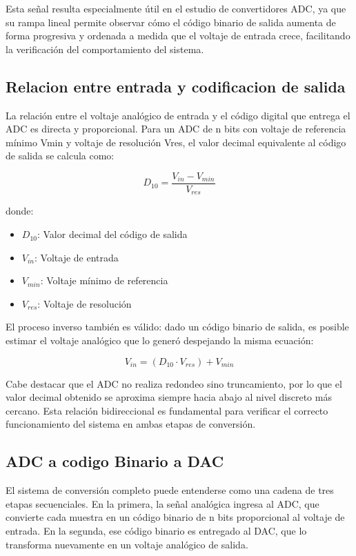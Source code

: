 \documentclass[12pt,letterpaper]{article}
\begin{document}
    Esta señal resulta especialmente útil en el estudio de convertidores ADC, ya que su rampa lineal permite observar cómo el código binario de salida aumenta de forma progresiva y ordenada a medida que el voltaje de entrada crece, facilitando la verificación del comportamiento del sistema.
 
    \subsection{Relacion entre entrada y codificacion de salida}
    La relación entre el voltaje analógico de entrada y el código digital que entrega el ADC es directa y proporcional. Para un ADC de n bits con voltaje de referencia mínimo Vmin y voltaje de resolución Vres, el valor decimal equivalente al código de salida se calcula como: 
    
    \begin{equation}
        D_{10} = \frac{V_{in} - V_{min}}{V_{res}}
        \label{Eq:D10}
    \end{equation}

    donde:
    \begin{itemize}
        \item $D_{10}$: Valor decimal del código de salida
        \item $V_{in}$: Voltaje de entrada
        \item $V_{min}$: Voltaje mínimo de referencia
        \item $V_{res}$: Voltaje de resolución
    \end{itemize}
    
    El proceso inverso también es válido: dado un código binario de salida, es posible estimar el voltaje analógico que lo generó despejando la misma ecuación:
    
    \begin{equation}
        V_{in} = (D_{10} \cdot V_{res}) + V_{min}
        \label{Vin}
    \end{equation}
    
    Cabe destacar que el ADC no realiza redondeo sino truncamiento, por lo que el valor decimal obtenido se aproxima siempre hacia abajo al nivel discreto más cercano. Esta relación bidireccional es fundamental para verificar el correcto funcionamiento del sistema en ambas etapas de conversión. 

    \subsection{ADC a codigo Binario a DAC}
    El sistema de conversión completo puede entenderse como una cadena de tres etapas secuenciales. En la primera, la señal analógica ingresa al ADC, que convierte cada muestra en un código binario de n bits proporcional al voltaje de entrada. En la segunda, ese código binario es entregado al DAC, que lo transforma nuevamente en un voltaje analógico de salida.
\end{document}
